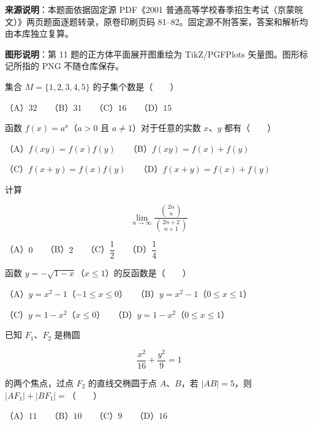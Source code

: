 


\begin{gktip}
\textbf{来源说明}：本题面依据固定源 PDF《2001 普通高等学校春季招生考试（京蒙皖文）》两页题面逐题转录，原卷印刷页码 81–82。固定源不附答案，答案和解析均由本库独立复算。

\textbf{图形说明}：第 11 题的正方体平面展开图重绘为 TikZ/PGFPlots 矢量图。图形标记所指的 PNG 不随仓库保存。
\end{gktip}


\begin{question}
集合 $M=\{1,2,3,4,5\}$ 的子集个数是\mbox{（　　）}

（A）$32$　　（B）$31$　　（C）$16$　　（D）$15$

\end{question}
\begin{question}
函数 $f(x)=a^x$（$a>0$ 且 $a\ne1$）对于任意的实数 $x\text{、}y$ 都有\mbox{（　　）}

（A）$f(xy)=f(x)f(y)$　　（B）$f(xy)=f(x)+f(y)$

（C）$f(x+y)=f(x)f(y)$　　（D）$f(x+y)=f(x)+f(y)$

\end{question}
\begin{question}
计算

\nopagebreak[4]
\[
\lim_{n\to\infty}\frac{\binom{2n}{n}}{\binom{2n+2}{n+1}}
\]

（A）$0$　　（B）$2$　　（C）$\dfrac12$　　（D）$\dfrac14$

\end{question}
\begin{question}
函数 $y=-\sqrt{1-x}$（$x\le1$）的反函数是\mbox{（　　）}

（A）$y=x^2-1$（$-1\le x\le0$）　　（B）$y=x^2-1$（$0\le x\le1$）

（C）$y=1-x^2$（$x\le0$）　　（D）$y=1-x^2$（$0\le x\le1$）

\end{question}
\begin{question}
已知 $F_1\text{、}F_2$ 是椭圆

\nopagebreak[4]
\[
\frac{x^2}{16}+\frac{y^2}{9}=1
\]

的两个焦点，过点 $F_2$ 的直线交椭圆于点 $A\text{、}B$，若 $|AB|=5$，则 $|AF_1|+|BF_1|=$\mbox{（　　）}

（A）$11$　　（B）$10$　　（C）$9$　　（D）$16$

\end{question}
